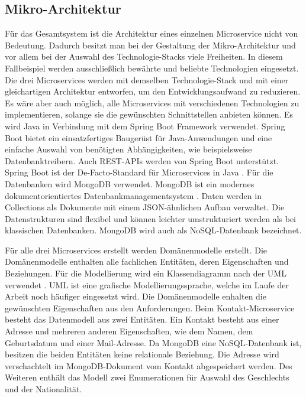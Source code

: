 \subsection{Mikro-Architektur}
Für das Gesamtsystem ist die Architektur eines einzelnen Microservice nicht von Bedeutung. Dadurch besitzt man bei der Gestaltung der Mikro-Architektur und vor allem bei der Auswahl des Technologie-Stacks viele Freiheiten. In diesem Fallbeispiel werden ausschließlich bewährte und beliebte Technologien eingesetzt. Die drei Microservices werden mit demselben Technologie-Stack und mit einer gleichartigen Architektur entworfen, um den Entwicklungsaufwand zu reduzieren. Es wäre aber auch möglich, alle Microservices mit verschiedenen Technologien zu implementieren, solange sie die gewünschten Schnittstellen anbieten können. Es wird Java in Verbindung mit dem Spring Boot Framework verwendet. Spring Boot bietet ein einsatzfertiges Baugerüst für Java-Anwendungen und eine einfache Auswahl von benötigten Abhängigkeiten, wie beispielsweise Datenbanktreibern. Auch REST-APIs werden von Spring Boot unterstützt. Spring Boot ist der De-Facto-Standard für Microservices in Java \parencite[vgl.][]{vmwareinc.Spring2022}. Für die Datenbanken wird MongoDB verwendet. MongoDB ist ein modernes dokumentorientiertes Datenbankmanagementsystem  \parencite[vgl.][]{mongodbinc.MongoDB2022}. Daten werden in Collections als Dokumente mit einem \ac{JSON}-ähnlichen Aufbau verwaltet. Die Datenstrukturen sind flexibel und können leichter umstrukturiert werden als bei klassischen Datenbanken. MongoDB wird auch als NoSQL-Datenbank bezeichnet.

Für alle drei Microservices erstellt werden Domänenmodelle erstellt. Die Domänenmodelle enthalten alle fachlichen Entitäten, deren Eigenschaften und Beziehungen. Für die Modellierung wird ein Klassendiagramm nach der \ac{UML} verwendet \parencite[vgl.][]{Unified2017}. \ac{UML} ist eine grafische Modellierungssprache, welche im Laufe der Arbeit noch häufiger eingesetzt wird. Die Domänenmodelle enhalten die gewünschten Eigenschaften aus den Anforderungen. Beim Kontakt-Microservice besteht das Datenmodell aus zwei Entitäten. Ein Kontakt besteht aus einer Adresse und mehreren anderen Eigenschaften, wie dem Namen, dem Geburtsdatum und einer Mail-Adresse. Da MongoDB eine NoSQL-Datenbank ist, besitzen die beiden Entitäten keine relationale Beziehung. Die Adresse wird verschachtelt im MongoDB-Dokument vom Kontakt abgespeichert werden. Des Weiteren enthält das Modell zwei Enumerationen für Auswahl des Geschlechts und der Nationalität.

